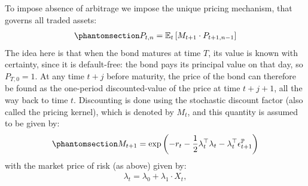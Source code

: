 \documentclass[
  letterpaper,
  DIV=11,
  numbers=noendperiod]{scrreprt}
\begin{document}
To impose absence of arbitrage we impose the unique pricing mechanism,
that governs all traded assets:
\begin{equation}\protect\phantomsection\label{eq-noArbitrage}{
\begin{align}
    P_{t,n} = \mathbb{E}_t \left[ M_{t+1}\cdot P_{t+1,n-1} \right]
\end{align}
}\end{equation} The idea here is that when the bond matures at time
\(T\), its value is known with certainty, since it is default-free: the
bond pays its principal value on that day, so \(P_{T,0}=1\). At any time
\(t+j\) before maturity, the price of the bond can therefore be found as
the one-period discounted-value of the price at time \(t+j+1\), all the
way back to time \(t\). Discounting is done using the stochastic
discount factor (also called the pricing kernel), which is denoted by
\(M_t\), and this quantity is assumed to be given by:
\begin{equation}\protect\phantomsection\label{eq-kernel}{
\begin{align} 
    M_{t+1} = \text{exp}\left( -r_t -\frac{1}{2} \lambda^{\top}_t \lambda_t - \lambda^{\top}_t \epsilon^\mathbb{P}_{t+1} \right)
\end{align}
}\end{equation} with the market price of risk (as above) given by:
\begin{align}
    \lambda_t = \lambda_0 + \lambda_1 \cdot X_t,
\end{align}
\end{document}
